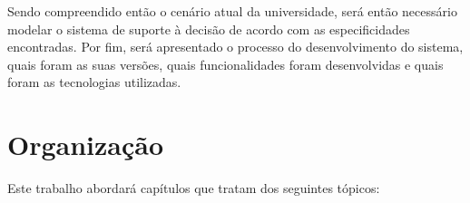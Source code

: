 
Sendo compreendido então o cenário atual da universidade, será então necessário modelar o sistema de suporte à decisão de acordo com as especificidades encontradas. Por fim, será apresentado o processo do desenvolvimento do sistema, quais foram as suas versões, quais funcionalidades foram desenvolvidas e quais foram as tecnologias utilizadas.

\section{Organização} \label{sec:Organização}            %

Este trabalho abordará capítulos que tratam dos seguintes tópicos:

